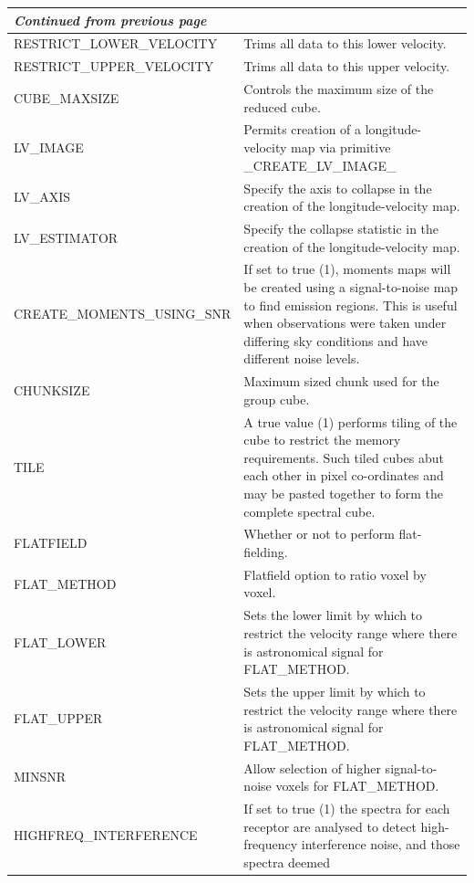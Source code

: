 \documentclass[11pt,oneside,chapters]{starlink}
\begin{document}
\begin{table}[t!]
\begin{small}
\begin{tabular}{|p{7.5cm}|p{8cm}|}
\hline
\multicolumn{2}{|l|}{\emph{Continued from previous page}}\\
\hline
RESTRICT\_LOWER\_VELOCITY & Trims all data to this lower velocity.\\
RESTRICT\_UPPER\_VELOCITY & Trims all data to this upper velocity.\\
\hline
CUBE\_MAXSIZE& Controls the maximum size of the reduced cube.\\
\hline
LV\_IMAGE & Permits creation of a longitude-velocity map via primitive \_CREATE\_LV\_IMAGE\_\\
LV\_AXIS & Specify the axis to collapse in the creation of the longitude-velocity map.\\
LV\_ESTIMATOR & Specify the collapse statistic in the creation of the longitude-velocity map.\\
\hline
CREATE\_MOMENTS\_USING\_SNR & If set to true (1), moments maps will be created using a
                              signal-to-noise map to find emission regions. This is useful
                              when observations were taken under differing sky conditions
                              and have different noise levels.\\
\hline
CHUNKSIZE & Maximum sized chunk used for the group cube.\\
\hline
TILE & A true value (1) performs tiling of the cube to restrict the memory requirements.  Such
       tiled cubes abut each other in pixel co-ordinates and may be pasted together to form
       the complete spectral cube. \\
\hline
FLATFIELD & Whether or not to perform flat-fielding.\\
FLAT\_METHOD & Flatfield option to ratio voxel by voxel.\\
FLAT\_LOWER & Sets the lower limit by which to restrict the velocity range where there is
              astronomical signal for FLAT\_METHOD.\\
FLAT\_UPPER & Sets the upper limit by which to restrict the velocity range where there is
              astronomical signal for FLAT\_METHOD.\\
MINSNR & Allow selection of higher signal-to-noise voxels for FLAT\_METHOD. \\
\hline
HIGHFREQ\_INTERFERENCE & If set to true (1) the spectra for each receptor are analysed to
                         detect high-frequency interference noise, and those spectra deemed

\end{tabular}
\end{small}
\end{table}
\end{document}
